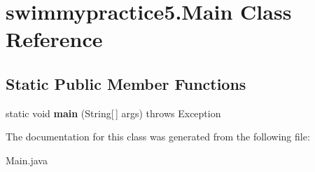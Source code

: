 \hypertarget{classswimmypractice5_1_1_main}{}\section{swimmypractice5.\+Main Class Reference}
\label{classswimmypractice5_1_1_main}
\subsection*{Static Public Member Functions}
\begin{DoxyCompactItemize}
\item 
\mbox{\label{classswimmypractice5_1_1_main_a7b62064a97d750db92bed427b7d5324d}} 
static void {\bfseries main} (String\mbox{[}$\,$\mbox{]} args)  throws Exception 
\end{DoxyCompactItemize}


The documentation for this class was generated from the following file\+:\begin{DoxyCompactItemize}
\item 
Main.\+java\end{DoxyCompactItemize}
